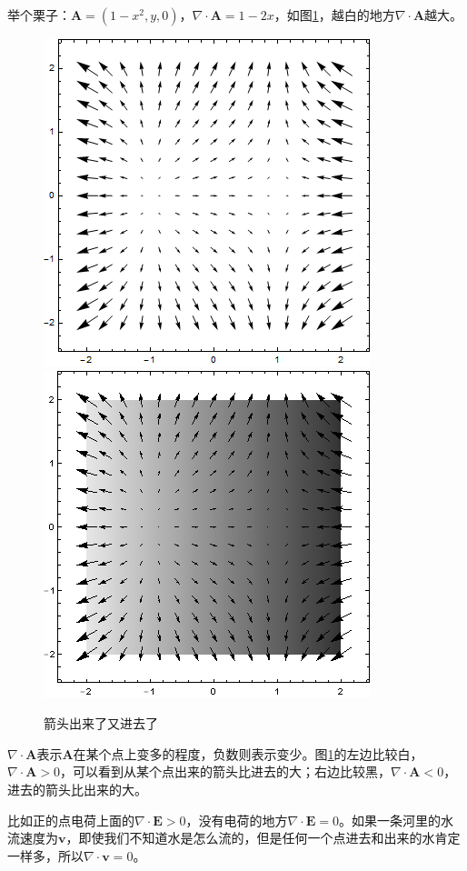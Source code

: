 举个栗子：$\mathbf{A}=(1-x^2,y,0)$，$\nabla \cdot \mathbf{A}=1-2x$，如图\ref{fig-vec-div}，越白的地方$\nabla \cdot \mathbf{A}$越大。
\begin{figure}[htb]
\centering
\includegraphics[scale=0.5]{fig/vec-div}
\includegraphics[scale=0.5]{fig/vec-div-2}
\caption{箭头出来了又进去了}
\label{fig-vec-div}
\end{figure}

$\nabla \cdot \mathbf{A}$表示$\mathbf{A}$在某个点上变多的程度，负数则表示变少。图\ref{fig-vec-div}的左边比较白，$\nabla \cdot \mathbf{A}>0$，可以看到从某个点出来的箭头比进去的大；右边比较黑，$\nabla \cdot \mathbf{A}<0$，进去的箭头比出来的大。

比如正的点电荷上面的$\nabla \cdot \mathbf{E}>0$，没有电荷的地方$\nabla \cdot \mathbf{E}=0$。如果一条河里的水流速度为$\mathbf{v}$，即使我们不知道水是怎么流的，但是任何一个点进去和出来的水肯定一样多，所以$\nabla \cdot \mathbf{v}=0$。

